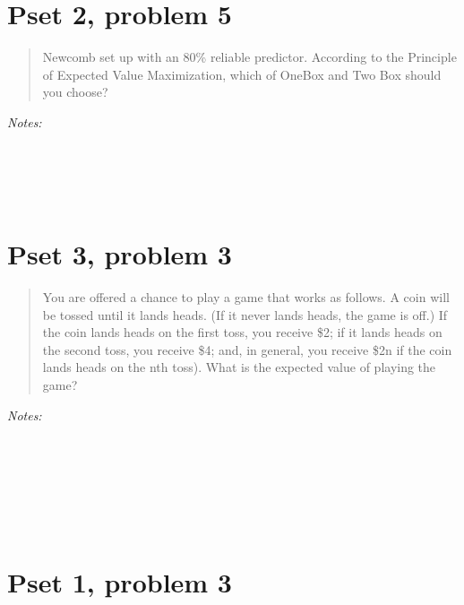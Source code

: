 \documentclass[justified]{tufte-handout}
\begin{document}
\section{Pset 2, problem 5}

\begin{quote}Newcomb set up with an 80\% reliable predictor. According to the Principle of Expected Value Maximization, which of OneBox and Two Box should you choose?\end{quote}

\noindent \emph{Notes:}  \underline{\hspace{15.4cm}}\\\\\underline{\hspace{16.43cm}}\\\\\underline{\hspace{16.43cm}}\\

\section{Pset 3, problem 3}

\begin{quote}You are offered a chance to play a game that works as follows. A coin will be tossed until it lands heads. (If it never lands heads, the game is off.) If the coin lands heads on the first toss, you receive \$2; if it lands heads on the second toss, you receive \$4; and, in general, you receive \$2n if the coin lands heads on the nth toss). What is the expected value of playing the game?\end{quote}

\noindent \emph{Notes:}  \underline{\hspace{15.4cm}}\\\\\underline{\hspace{16.43cm}}\\\\\underline{\hspace{16.43cm}}\\\\\underline{\hspace{16.43cm}}\\

\section{Pset 1, problem 3}
\end{document}
